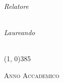\begin{titlepage}
    \vspace{1cm}
    
    
    \begin{LARGE}
        \begin{center}
            \textbf{\myTitle}\\
        \end{center}
    \end{LARGE}
    
    
    \vspace{1.5cm}
    
    \begin{large}
        \begin{flushleft}
            \textit{Relatore}\\ 
            \vspace{5pt} 
            \profTitle\ \myProf
        \end{flushleft}
        
        \begin{flushright}
            \textit{Laureando}\\ 
            \vspace{5pt} 
            \myName\\
            \matricola
        \end{flushright}
    \end{large}
    \vspace{1.3cm}
    
    \line(1, 0){385} \\
    \begin{normalsize}
        \textsc{Anno Accademico \myAA}
    \end{normalsize}
    
    \vfill 
    
\end{titlepage}
